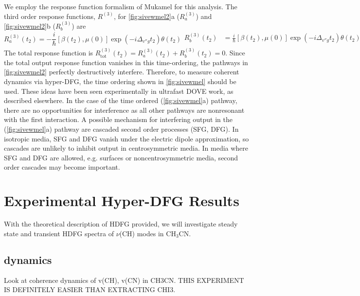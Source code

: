 \documentclass[aip, jcp, reprint, onecolumn]{revtex4-2}
\begin{document}
We employ the response function formalism of Mukamel for this analysis. \cite{RN287}
The third order response functions, $R^{(3)}$, for \autoref{fig:sivewmel2}a ($R^{(3)}_{a}$) and \autoref{fig:sivewmel2}b ($R^{(3)}_{b}$) are 
\begin{subequations}
	\begin{equation} \label{mixing:a}
		R^{(3)}_{a} (t_2) = -\frac{i}{\hbar} [\beta(t_2), \mu(0)] \exp(-i\Delta_{v''g}t_2) \theta(t_2)
	\end{equation}
	\begin{equation}\label{mixing:b}
		\begin{split}
			R^{(3)}_{b} (t_2) & = \frac{i}{\hbar} [\beta(t_2), \mu(0)] \exp(-i\Delta_{v''g}t_2) \theta(t_2)\\
		\end{split}
	\end{equation}
\end{subequations}
The total response function is $R^{(3)}_\text{tot} (t_2) = R^{(3)}_{a} (t_2) + R^{(3)}_{b} (t_2) = 0$. 
Since the total output response function vanishes in this time-ordering, the pathways in \autoref{fig:sivewmel2} perfectly destructively interfere.
Therefore, to measure coherent dynamics via hyper-DFG, the time ordering shown in \autoref{fig:sivewmel} should be used.
These ideas have been seen experimentally in ultrafast DOVE work, as described elsewhere. \cite{RN367, McDonnell2024}
In the case of the time ordered (\autoref{fig:sivewmel}a) pathway, there are no opportunities for interference as all other pathways are nonresonant with the first interaction. 
A possible mechanism for interfering output in the (\autoref{fig:sivewmel}a) pathway are cascaded second order processes (SFG, DFG). \cite{RN243, RN300}
In isotropic media, SFG and DFG vanish under the electric dipole approximation,\cite{RN231} so cascades are unlikely to inhibit output in centrosymmetric media.
In media where SFG and DFG are allowed, e.g. surfaces or noncentrosymmetric media, second order cascades may become important. 



\section{Experimental Hyper-DFG Results}
With the theoretical description of HDFG provided, we will investigate steady state and transient HDFG spectra of $\nu$(CH) modes in CH$_3$CN.

\subsection{dynamics} 
Look at coherence dynamics of v(CH), v(CN) in CH3CN. 
THIS EXPERIMENT IS DEFINITELY EASIER THAN EXTRACTING CHI3. 
 
\end{document}
